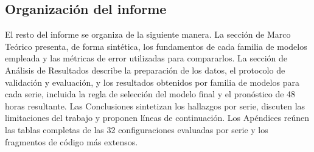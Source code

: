 \subsection{Organización del informe}

El resto del informe se organiza de la siguiente manera. La sección de Marco Teórico presenta, de forma
sintética, los fundamentos de cada familia de modelos empleada y las métricas de error utilizadas para
compararlos. La sección de Análisis de Resultados describe la preparación de los datos, el protocolo de
validación y evaluación, y los resultados obtenidos por familia de modelos para cada serie, incluida la
regla de selección del modelo final y el pronóstico de 48 horas resultante. Las Conclusiones sintetizan
los hallazgos por serie, discuten las limitaciones del trabajo y proponen líneas de continuación. Los
Apéndices reúnen las tablas completas de las 32 configuraciones evaluadas por serie y los fragmentos de
código más extensos.
